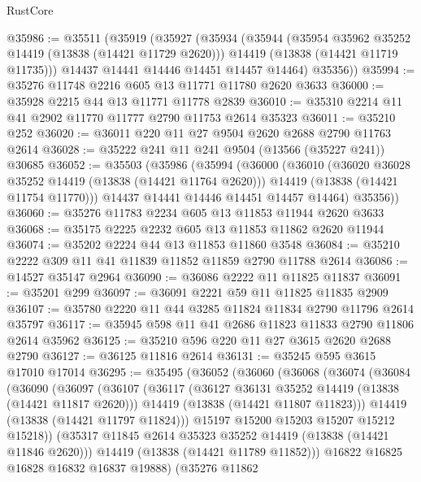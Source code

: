 \begin{lexlean}{RustCore}
\begin{coremodule}
@35986 := @35511
    (@35919
      (@35927
        (@35934
          (@35944
            (@35954 @35962 @35252 @14419 (@13838 (@14421 @11729 @2620)))
            @14419
            (@13838 (@14421 @11719 @11735)))
          @14437
          @14441
          @14446
          @14451
          @14457
          @14464)
        @35356))
@35994 := @35276 @11748 @2216 @605 @13 @11771 @11780 @2620 @3633
@36000 := @35928 @2215 @44 @13 @11771 @11778 @2839
@36010 := @35310 @2214 @11 @41 @2902 @11770 @11777 @2790 @11753 @2614 @35323
@36011 := @35210 @252
@36020 := @36011 @220 @11 @27 @9504 @2620 @2688 @2790 @11763 @2614
@36028 := @35222 @241 @11 @241 @9504 (@13566 (@35227 @241)) @30685
@36052 := @35503
    (@35986
      (@35994
        (@36000
          (@36010
            (@36020 @36028 @35252 @14419 (@13838 (@14421 @11764 @2620)))
            @14419
            (@13838 (@14421 @11754 @11770)))
          @14437
          @14441
          @14446
          @14451
          @14457
          @14464)
        @35356))
@36060 := @35276 @11783 @2234 @605 @13 @11853 @11944 @2620 @3633
@36068 := @35175 @2225 @2232 @605 @13 @11853 @11862 @2620 @11944
@36074 := @35202 @2224 @44 @13 @11853 @11860 @3548
@36084 := @35210 @2222 @309 @11 @41 @11839 @11852 @11859 @2790 @11788 @2614
@36086 := @14527 @35147 @2964
@36090 := @36086 @2222 @11 @11825 @11837
@36091 := @35201 @299
@36097 := @36091 @2221 @59 @11 @11825 @11835 @2909
@36107 := @35780 @2220 @11 @44 @3285 @11824 @11834 @2790 @11796 @2614 @35797
@36117 := @35945 @598 @11 @41 @2686 @11823 @11833 @2790 @11806 @2614 @35962
@36125 := @35210 @596 @220 @11 @27 @3615 @2620 @2688 @2790
@36127 := @36125 @11816 @2614
@36131 := @35245 @595 @3615 @17010 @17014
@36295 := @35495
    (@36052
      (@36060
        (@36068
          (@36074
            (@36084
              (@36090
                (@36097
                  (@36107
                    (@36117
                      (@36127 @36131 @35252 @14419 (@13838 (@14421 @11817 @2620)))
                      @14419
                      (@13838 (@14421 @11807 @11823)))
                    @14419
                    (@13838 (@14421 @11797 @11824)))
                  @15197
                  @15200
                  @15203
                  @15207
                  @15212
                  @15218))
              (@35317 @11845 @2614 @35323 @35252 @14419 (@13838 (@14421 @11846 @2620)))
              @14419
              (@13838 (@14421 @11789 @11852)))
            @16822
            @16825
            @16828
            @16832
            @16837
            @19888)
          (@35276
            @11862

\end{coremodule}
\end{lexlean}
